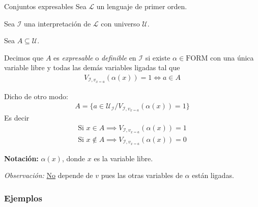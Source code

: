     \medskip

    \begin{definicion}{Conjuntos expresables}{}
        Sea $\mathcal{L}$ un lenguaje de primer orden.

        Sea $\mathcal{I}$ una interpretación de $\mathcal{L}$ con universo 
        $\mathcal{U}$.

        Sea $A \subseteq \mathcal{U}$.

        \medskip

        Decimos que $A$ es \textit{expresable} o \textit{definible} en 
        $\mathcal{I}$ si existe 
        $\alpha \in \mathrm{FORM}$ con una única  variable libre y todas las demás 
        variables ligadas tal que
        \begin{gather*}
            V_{\mathcal{I}, v_{x=a}} (\alpha(x)) = 1 \iff a \in A
        \end{gather*}

        \medskip

        Dicho de otro modo:
        \begin{gather*}
            A = \{ a \in \mathcal{U}_{\mathcal{I}} /
            V_{\mathcal{I}, v_{x=a}} (\alpha(x))=1 \}
        \end{gather*}
        Es decir
        \begin{gather*}
            \text{Si } x \in A \implies V_{\mathcal{I}, v_{x=a}} (\alpha(x)) = 1\\
            \text{Si } x \notin A \implies V_{\mathcal{I}, v_{x=a}} (\alpha(x))=0
        \end{gather*}

        \bigskip
        \textbf{Notación:}
        $\alpha(x)$, donde $x$ es la variable libre.
    \end{definicion}

    \bigskip
    \textit{Observación:}
    \underline{No} depende de $v$ pues las otras variables de $\alpha$ están 
    ligadas.

    \subsubsection{Ejemplos}

